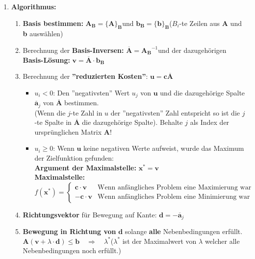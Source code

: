 \begin{enumerate}
\item \textbf{Algorithmus:}
	\begin{enumerate}
	\item \textbf{Basis bestimmen: } $\boxed{\mathbf{A_B}=\{\mathbf{A}\}_{\mathbf{B}}}$\quad und \quad $\boxed{\mathbf{b}_\mathbf{B}=\{\mathbf{b}\}_{\mathbf{B}}}$\quad ($B_i$-te Zeilen aus \textbf{A} und \textbf{b} auswählen)\\
	\item Berechnung der \textbf{Basis-Inversen: }$\boxed{\overline{\mathbf{A}}=\mathbf{A_B}^{-1}}$\quad und der dazugehörigen \textbf{Basis-Lösung: }$\boxed{\mathbf{v}=\mathbf{\overline{A}}\cdot\mathbf{b_B}}$\\
	\item Berechnung der \textbf{''reduzierten Kosten''}: $\boxed{\mathbf{u}=\mathbf{c\overline{A}}}$
	\begin{itemize}
		\item $u_i<0$: Den ''negativsten'' Wert $u_j$ von $\mathbf{u}$ und die dazugehörige Spalte $\mathbf{\overline{a}}_j$ von $\mathbf{\overline{A}}$ bestimmen.\\
		(Wenn die $j$-te Zahl in $u$ der ''negativsten'' Zahl entspricht so ist die $j$-te Spalte in $\mathbf{\overline{A}}$ die dazugehörige Spalte). Behalte $j$ als Index der ursprünglichen Matrix $\mathbf{A}$!
		\item $u_i\geq 0$: Wenn $\mathbf{u}$ keine negativen Werte aufweist, wurde das Maximum der Zielfunktion gefunden:\\
		\textbf{Argument der Maximalstelle:} $\boxed{\mathbf{x^*}=\mathbf{v}}$\\
		\textbf{Maximalstelle:} 
		$\boxed{f(\mathbf{x^*})=\left\{
		  \begin{array}{ll}
		    \mathbf{c}\cdot\mathbf{v} & \text{Wenn anfängliches Problem eine Maximierung war}\\
		    -\mathbf{c}\cdot\mathbf{v}& \text{Wenn anfängliches Problem eine Minimierung war}
		  \end{array}
		\right.}$
	\end{itemize}
	\item \textbf{Richtungsvektor} für Bewegung auf Kante: $\boxed{\mathbf{d}=-\mathbf{\overline{a}}_j}$
	\item \textbf{Bewegung in Richtung von} $\mathbf{d}$ solange \textbf{alle} Nebenbedingungen erfüllt.\\
	
	$\boxed{\mathbf{A}(\mathbf{v}+\lambda\cdot \mathbf{d})\leq \mathbf{b}}\quad\Rightarrow\quad\lambda^*$\quad($\lambda^*$ ist der Maximalwert von $\lambda$ welcher alle Nebenbedingungen noch erfüllt.)\\
		

\end{enumerate}
\end{enumerate}
